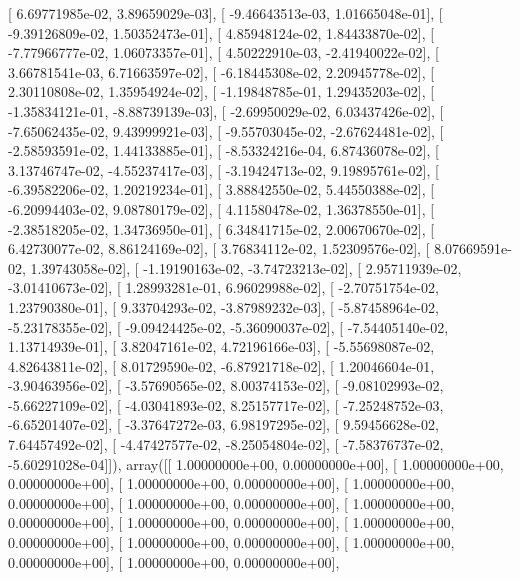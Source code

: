\documentclass{article}
\begin{document}
       [  6.69771985e-02,   3.89659029e-03],
       [ -9.46643513e-03,   1.01665048e-01],
       [ -9.39126809e-02,   1.50352473e-01],
       [  4.85948124e-02,   1.84433870e-02],
       [ -7.77966777e-02,   1.06073357e-01],
       [  4.50222910e-03,  -2.41940022e-02],
       [  3.66781541e-03,   6.71663597e-02],
       [ -6.18445308e-02,   2.20945778e-02],
       [  2.30110808e-02,   1.35954924e-02],
       [ -1.19848785e-01,   1.29435203e-02],
       [ -1.35834121e-01,  -8.88739139e-03],
       [ -2.69950029e-02,   6.03437426e-02],
       [ -7.65062435e-02,   9.43999921e-03],
       [ -9.55703045e-02,  -2.67624481e-02],
       [ -2.58593591e-02,   1.44133885e-01],
       [ -8.53324216e-04,   6.87436078e-02],
       [  3.13746747e-02,  -4.55237417e-03],
       [ -3.19424713e-02,   9.19895761e-02],
       [ -6.39582206e-02,   1.20219234e-01],
       [  3.88842550e-02,   5.44550388e-02],
       [ -6.20994403e-02,   9.08780179e-02],
       [  4.11580478e-02,   1.36378550e-01],
       [ -2.38518205e-02,   1.34736950e-01],
       [  6.34841715e-02,   2.00670670e-02],
       [  6.42730077e-02,   8.86124169e-02],
       [  3.76834112e-02,   1.52309576e-02],
       [  8.07669591e-02,   1.39743058e-02],
       [ -1.19190163e-02,  -3.74723213e-02],
       [  2.95711939e-02,  -3.01410673e-02],
       [  1.28993281e-01,   6.96029988e-02],
       [ -2.70751754e-02,   1.23790380e-01],
       [  9.33704293e-02,  -3.87989232e-03],
       [ -5.87458964e-02,  -5.23178355e-02],
       [ -9.09424425e-02,  -5.36090037e-02],
       [ -7.54405140e-02,   1.13714939e-01],
       [  3.82047161e-02,   4.72196166e-03],
       [ -5.55698087e-02,   4.82643811e-02],
       [  8.01729590e-02,  -6.87921718e-02],
       [  1.20046604e-01,  -3.90463956e-02],
       [ -3.57690565e-02,   8.00374153e-02],
       [ -9.08102993e-02,  -5.66227109e-02],
       [ -4.03041893e-02,   8.25157717e-02],
       [ -7.25248752e-03,  -6.65201407e-02],
       [ -3.37647272e-03,   6.98197295e-02],
       [  9.59456628e-02,   7.64457492e-02],
       [ -4.47427577e-02,  -8.25054804e-02],
       [ -7.58376737e-02,  -5.60291028e-04]]), array([[  1.00000000e+00,   0.00000000e+00],
       [  1.00000000e+00,   0.00000000e+00],
       [  1.00000000e+00,   0.00000000e+00],
       [  1.00000000e+00,   0.00000000e+00],
       [  1.00000000e+00,   0.00000000e+00],
       [  1.00000000e+00,   0.00000000e+00],
       [  1.00000000e+00,   0.00000000e+00],
       [  1.00000000e+00,   0.00000000e+00],
       [  1.00000000e+00,   0.00000000e+00],
       [  1.00000000e+00,   0.00000000e+00],
       [  1.00000000e+00,   0.00000000e+00],
\end{document}
